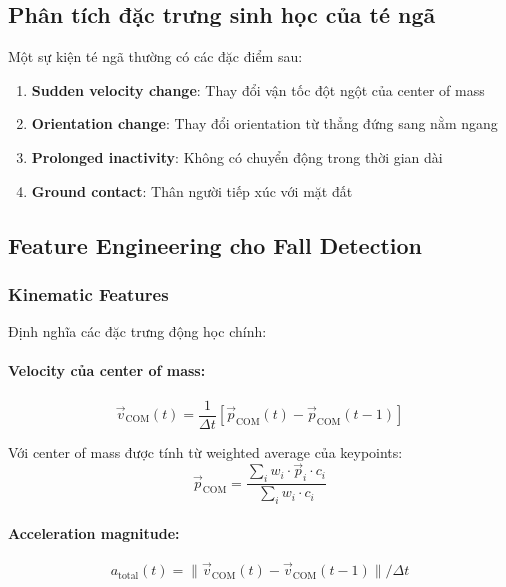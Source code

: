\subsection{Phân tích đặc trưng sinh học của té ngã}

Một sự kiện té ngã thường có các đặc điểm sau:
\begin{enumerate}
    \item \textbf{Sudden velocity change}: Thay đổi vận tốc đột ngột của center of mass
    \item \textbf{Orientation change}: Thay đổi orientation từ thẳng đứng sang nằm ngang
    \item \textbf{Prolonged inactivity}: Không có chuyển động trong thời gian dài
    \item \textbf{Ground contact}: Thân người tiếp xúc với mặt đất
\end{enumerate}

\subsection{Feature Engineering cho Fall Detection}

\subsubsection{Kinematic Features}
Định nghĩa các đặc trưng động học chính:

\paragraph{Velocity của center of mass:}
\begin{equation}
\vec{v}_{\text{COM}}(t) = \frac{1}{\Delta t}[\vec{p}_{\text{COM}}(t) - \vec{p}_{\text{COM}}(t-1)]
\end{equation}

Với center of mass được tính từ weighted average của keypoints:
\begin{equation}
\vec{p}_{\text{COM}} = \frac{\sum_{i} w_i \cdot \vec{p}_i \cdot c_i}{\sum_{i} w_i \cdot c_i}
\end{equation}

\paragraph{Acceleration magnitude:}
\begin{equation}
a_{\text{total}}(t) = \|\vec{v}_{\text{COM}}(t) - \vec{v}_{\text{COM}}(t-1)\| / \Delta t
\end{equation}


